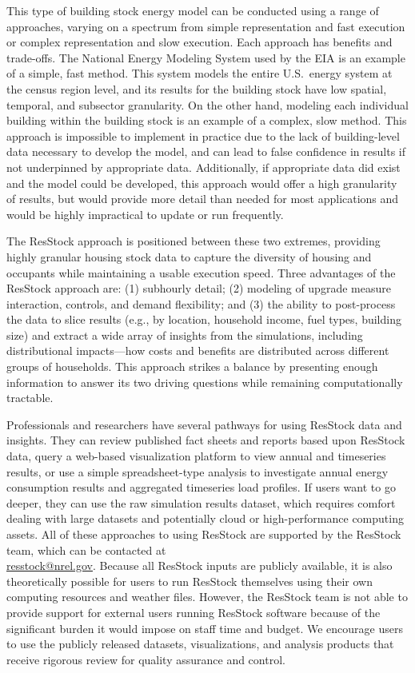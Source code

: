 This type of building stock energy model can be conducted using a range of approaches, varying on a spectrum from simple representation and fast execution or complex representation and slow execution. Each approach has benefits and trade-offs. The National Energy Modeling System used by the EIA is an example of a simple, fast method. This system models the entire U.S.~energy system at the census region level, and its results for the building stock have low spatial, temporal, and subsector granularity. On the other hand, modeling each individual building within the building stock is an example of a complex, slow method. This approach is impossible to implement in practice due to the lack of building-level data necessary to develop the model, and can lead to false confidence in results if not underpinned by appropriate data. Additionally, if appropriate data did exist and the model could be developed, this approach would offer a high granularity of results, but would provide more detail than needed for most applications and would be highly impractical to update or run frequently.

The ResStock approach is positioned between these two extremes, providing highly granular housing stock data to capture the diversity of housing and occupants while maintaining a usable execution speed. Three advantages of the ResStock approach are: (1) subhourly detail; (2) modeling of upgrade measure interaction, controls, and demand flexibility; and (3) the ability to post-process the data to slice results (e.g., by location, household income, fuel types, building size) and extract a wide array of insights from the simulations, including distributional impacts---how costs and benefits are distributed across different groups of households. This approach strikes a balance by presenting enough information to answer its two driving questions while remaining computationally tractable.  

Professionals and researchers have several pathways for using ResStock data and insights. They can review published fact sheets and reports based upon ResStock data, query a web-based visualization platform to view annual and timeseries results, or use a simple spreadsheet-type analysis to investigate annual energy consumption results and aggregated timeseries load profiles. If users want to go deeper, they can use the raw simulation results dataset, which requires comfort dealing with large datasets and potentially cloud or high-performance computing assets. All of these approaches to using ResStock are supported by the ResStock team, which can be contacted at \\
\href{mailto:resstock@nrel.gov}{resstock@nrel.gov}. Because all ResStock inputs are publicly available, it is also theoretically possible for users to run ResStock themselves using their own computing resources and weather files. However, the ResStock team is not able to provide support for external users running ResStock software because of the significant burden it would impose on staff time and budget. We encourage users to use the publicly released datasets, visualizations, and analysis products that receive rigorous review for quality assurance and control.

